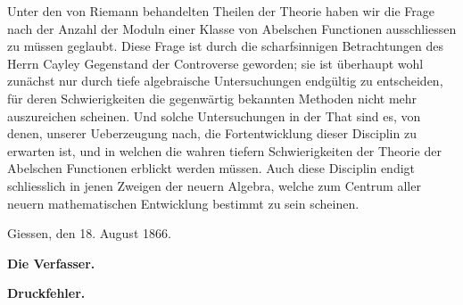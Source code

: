 \documentclass[10pt]{article}
\begin{document}
Unter den von Riemann behandelten Theilen der Theorie haben wir die Frage nach der Anzahl der Moduln einer Klasse von Abelschen Functionen ausschliessen zu müssen geglaubt. Diese Frage ist durch die scharfsinnigen Betrachtungen des Herrn Cayley Gegenstand der Controverse geworden; sie ist überhaupt wohl zunächst nur durch tiefe algebraische Untersuchungen endgültig zu entscheiden, für deren Schwierigkeiten die gegenwärtig bekannten Methoden nicht mehr auszureichen scheinen. Und solche Untersuchungen in der That sind es, von denen, unserer Ueberzeugung nach, die Fortentwicklung dieser Disciplin zu erwarten ist, und in welchen die wahren tiefern Schwierigkeiten der Theorie der Abelschen Functionen erblickt werden müssen. Auch diese Disciplin endigt schliesslich in jenen Zweigen der neuern Algebra, welche zum Centrum aller neuern mathematischen Entwicklung bestimmt zu sein scheinen.

\vspace{0.6em}
\noindent Giessen, den 18. August 1866.

\begin{flushright}
{\bfseries Die Verfasser.}
\end{flushright}

\vspace{1.0em}

\begin{center}
{\Large\bfseries Druckfehler.}
\end{center}
\end{document}
